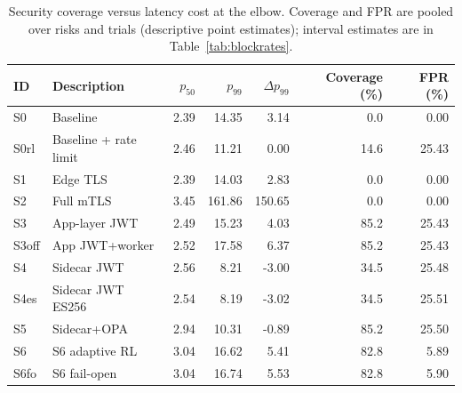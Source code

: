 \begin{table}[t]
\centering
\caption{Security coverage versus latency cost at the elbow. Coverage and FPR are pooled over risks and trials (descriptive point estimates); interval estimates are in Table~\ref{tab:blockrates}.}
\label{tab:cost}
\small
\begin{tabular}{llrrrrr}
\toprule
ID & Description & $p_{50}$ & $p_{99}$ & $\Delta p_{99}$ & Coverage (\%) & FPR (\%) \\
\midrule
S0 & Baseline & 2.39 & 14.35 & 3.14 & 0.0 & 0.00 \\
S0rl & Baseline + rate limit & 2.46 & 11.21 & 0.00 & 14.6 & 25.43 \\
S1 & Edge TLS & 2.39 & 14.03 & 2.83 & 0.0 & 0.00 \\
S2 & Full mTLS & 3.45 & 161.86 & 150.65 & 0.0 & 0.00 \\
S3 & App-layer JWT & 2.49 & 15.23 & 4.03 & 85.2 & 25.43 \\
S3off & App JWT+worker & 2.52 & 17.58 & 6.37 & 85.2 & 25.43 \\
S4 & Sidecar JWT & 2.56 & 8.21 & -3.00 & 34.5 & 25.48 \\
S4es & Sidecar JWT ES256 & 2.54 & 8.19 & -3.02 & 34.5 & 25.51 \\
S5 & Sidecar+OPA & 2.94 & 10.31 & -0.89 & 85.2 & 25.50 \\
S6 & S6 adaptive RL & 3.04 & 16.62 & 5.41 & 82.8 & 5.89 \\
S6fo & S6 fail-open & 3.04 & 16.74 & 5.53 & 82.8 & 5.90 \\
\bottomrule
\end{tabular}
\end{table}
